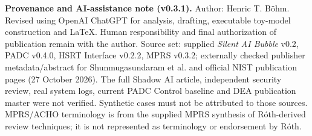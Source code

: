 \documentclass[11pt,a4paper]{article}
\begin{document}
\vspace{3pt}
\noindent\footnotesize\color{soft}\textbf{Provenance and AI-assistance note (v0.3.1).} Author: Henric T. B\"ohm. Revised using OpenAI ChatGPT for analysis, drafting, executable toy-model construction and LaTeX. Human responsibility and final authorization of publication remain with the author. Source set: supplied \emph{Silent AI Bubble} v0.2, PADC v0.4.0, HSRT Interface v0.2.2, MPRS v0.3.2; externally checked publisher metadata/abstract for Shunmugasundaram et al. and official NIST publication pages (27 October 2026). The full Shadow AI article, independent security review, real system logs, current PADC Control baseline and DEA publication master were not verified. Synthetic cases must not be attributed to those sources. MPRS/ACHO terminology is from the supplied MPRS synthesis of R\'oth-derived review techniques; it is not represented as terminology or endorsement by R\'oth.
\end{document}
